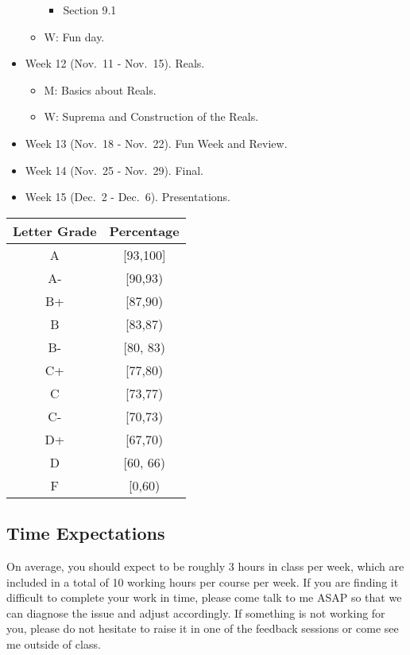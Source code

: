 \documentclass[
]{article}
\providecommand{\tightlist}{%
  \setlength{\itemsep}{0pt}\setlength{\parskip}{0pt}}
\begin{document}
\begin{itemize}
\begin{itemize}
    \begin{itemize}
    \tightlist
    \item
      Section 9.1
    \end{itemize}
  \item
    W: Fun day.
  \end{itemize}
\item
  Week 12 (Nov.~11 - Nov.~15). Reals.

  \begin{itemize}
  \tightlist
  \item
    M: Basics about Reals.
  \item
    W: Suprema and Construction of the Reals.
  \end{itemize}
\item
  Week 13 (Nov.~18 - Nov.~22). Fun Week and Review.
\item
  Week 14 (Nov.~25 - Nov.~29). Final.
\item
  Week 15 (Dec.~2 - Dec.~6). Presentations.
\end{itemize}

\begin{longtable}[]{@{}cc@{}}
\toprule\noalign{}
\textbf{Letter Grade} & \textbf{Percentage} \\
\midrule\noalign{}
\endhead
\bottomrule\noalign{}
\endlastfoot
A & {[}93,100{]} \\
A- & {[}90,93) \\
B+ & {[}87,90) \\
B & {[}83,87) \\
B- & {[}80, 83) \\
C+ & {[}77,80) \\
C & {[}73,77) \\
C- & {[}70,73) \\
D+ & {[}67,70) \\
D & {[}60, 66) \\
F & {[}0,60) \\
\end{longtable}

\subsection*{Time Expectations}\label{time-expectations}

On average, you should expect to be roughly 3 hours in class per week, which are included in a total of 10 working hours per course per week. If you are finding it difficult to complete your work in time, please come talk to me ASAP so that we can diagnose the issue and adjust accordingly. If something is not working for you, please do not hesitate to raise it in one of the feedback sessions or come see me outside of class.
\end{document}
